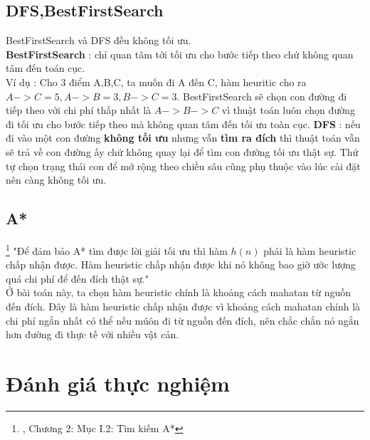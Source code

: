 \documentclass[11pt]{scrartcl} %
\begin{document}
\subsection{DFS,BestFirstSearch}
BestFirstSearch và DFS đều không tối ưu.\\
\textbf{BestFirstSearch} : chỉ quan tâm tới tối ưu cho bước tiếp theo chứ không quan tâm đến toán cục.\\
Ví dụ : Cho 3 điểm A,B,C, ta muốn đi A đến C, hàm heuritic cho ra $A->C = 5, A->B = 3, B->C = 3$. BestFirstSearch sẽ chọn con đường đi tiếp theo với chi phí thấp nhất là $A->B->C$ vì thuật toán luôn chọn đường đi tối ưu cho bước tiếp theo mà không quan tâm đến tối ưu toàn cục.
\textbf{DFS} : nếu đi vào một con đường \textbf{không tối ưu} nhưng vẫn \textbf{tìm ra đích} thì thuật toán vẫn sẽ trả về con đường ấy chứ không quay lại để tìm con đường tối ưu thật sự. Thứ tự chọn trạng thái con để mở rộng theo chiều sâu cũng phụ thuộc vào lúc cài đặt nên càng không tối ưu.\\
\subsection{A*}
\footnote{\cite{csttnt_lhb}, Chương 2: Mục I.2: Tìm kiếm A*} "Để đảm bảo A* tìm được lời giải tối ưu thì hàm $h(n)$ phải là hàm heuristic chấp nhận được. Hàm heuristic chấp nhận được khi nó không bao giờ ước lượng quá chi phí để đến đích thật sự."\\
Ở bài toán này, ta chọn hàm heuristic chính là khoảng cách mahatan từ nguồn đến đích. Đây là hàm heuristic chấp nhận được vì khoảng cách mahatan chính là chi phí ngắn nhất có thể nếu múôn đi từ nguồn đến đích, nên chắc chắn nó ngắn hơn đường đi thực tế với nhiều vật cản.\\
\newpage
\subsection{}
\section{Đánh giá thực nghiệm}
\end{document}

